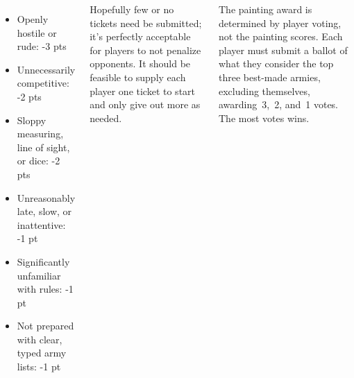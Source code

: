 \begin{columns}
\vspace*{-18pt}
\begin{itemize}\shortlist\setlength{\parskip}{0pt}\setlength{\itemsep}{2pt}
\item Openly hostile or rude: \hfill -3 pts
\item Unnecessarily competitive: \hfill -2 pts
\item Sloppy measuring, line of sight, or dice: \hfill -2 pts
\item Unreasonably late, slow, or inattentive: \hfill -1 pt
\item Significantly unfamiliar with rules:
  \hfill -1 pt
\item Not prepared with clear, typed army lists: \hfill -1 pt
\end{itemize}

\vspace*{-18pt}
Hopefully few or no tickets need be submitted; it's perfectly
acceptable for players to not penalize opponents.  It should be
feasible to supply each player one ticket to start and only give out
more as needed.

  The painting award is determined
by player voting, not the painting scores.  Each player must submit a
ballot of what they consider the top three best-made armies, excluding
themselves, awarding~3,~2, and~1 votes.  The most votes wins.

\end{columns}

\squelchbackground

%


\restorebackground
